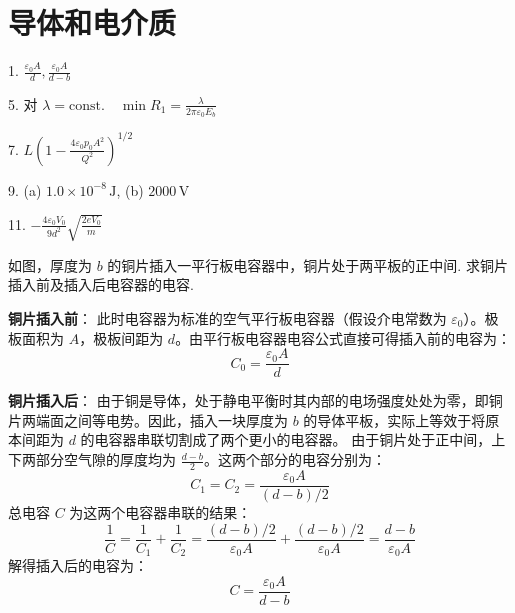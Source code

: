 \chapter{导体和电介质}

\begin{oddanswers}
1. $\frac{\varepsilon_0 A}{d}, \frac{\varepsilon_0 A}{d - b}$

5. 对 $\lambda = \text{const.} \quad \min R_1 = \frac{\lambda}{2\pi\varepsilon_0 E_b}$

7. $L \left( 1 - \frac{4\varepsilon_0 p_0 A^2}{Q^2} \right)^{1/2}$

9. (a) $1.0 \times 10^{-8}\,\mathrm{J}$, (b) $2000\,\mathrm{V}$

11. $-\frac{4\varepsilon_0 V_0}{9d^2} \sqrt{\frac{2eV_0}{m}}$
\end{oddanswers}

\begin{exercise}\label{ex:16.1}
如图，厚度为 $b$ 的铜片插入一平行板电容器中，铜片处于两平板的正中间. 求铜片插入前及插入后电容器的电容.
\begin{center}
\end{center}
\end{exercise}
\begin{solution}
\textbf{铜片插入前}：
此时电容器为标准的空气平行板电容器（假设介电常数为 $\varepsilon_0$）。极板面积为 $A$，极板间距为 $d$。由平行板电容器电容公式直接可得插入前的电容为：
$$ C_0 = \frac{\varepsilon_0 A}{d} $$

\textbf{铜片插入后}：
由于铜是导体，处于静电平衡时其内部的电场强度处处为零，即铜片两端面之间等电势。因此，插入一块厚度为 $b$ 的导体平板，实际上等效于将原本间距为 $d$ 的电容器串联切割成了两个更小的电容器。
由于铜片处于正中间，上下两部分空气隙的厚度均为 $\frac{d - b}{2}$。这两个部分的电容分别为：
$$ C_1 = C_2 = \frac{\varepsilon_0 A}{(d - b)/2} $$
总电容 $C$ 为这两个电容器串联的结果：
$$ \frac{1}{C} = \frac{1}{C_1} + \frac{1}{C_2} = \frac{(d - b)/2}{\varepsilon_0 A} + \frac{(d - b)/2}{\varepsilon_0 A} = \frac{d - b}{\varepsilon_0 A} $$
解得插入后的电容为：
$$ C = \frac{\varepsilon_0 A}{d - b} $$
\end{solution}

